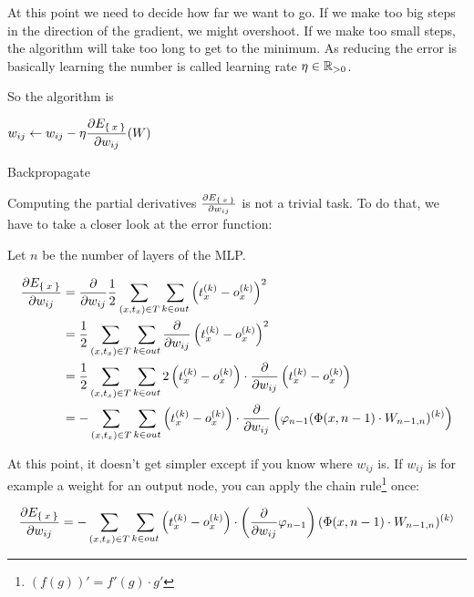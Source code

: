 At this point we need to decide how far we want to go. If we make too big steps
in the direction of the gradient, we might overshoot. If we make too small steps,
the algorithm will take too long to get to the minimum. As reducing the error
is basically learning the number is called learning rate $\eta \in \mathbb{R}_{> 0}$.

So the algorithm is

\begin{algorithm}[h]
    \begin{algorithmic}
                            \State $\displaystyle w_{ij} \gets w_{ij} - \eta \frac{\partial E_{\Set{x}}}{\partial w_{ij}} (W)$
                        \EndFor
                    \EndFor
                \EndFor
            \EndWhile
        \EndFunction
    \end{algorithmic}
\caption{Backpropagate}
\label{alg:backpropagate}
\end{algorithm}

Computing the partial derivatives $\frac{\partial E_{\Set{x}}}{\partial w_{ij}}$
is not a trivial task. To do that, we have to take a closer look at the
error function:

Let $n$ be the number of layers of the \gls{MLP}.

\begin{align}
    \frac{\partial E_{\Set{x}}}{\partial w_{ij}}
    &= \frac{\partial}{\partial w_{ij}} \frac{1}{2} \sum_{(x, t_x) \in T} \sum_{k \in out} \left (t_{x}^{(k)} - o_{x}^{(k)} \right )^2\\
    &= \frac{1}{2} \sum_{(x, t_x) \in T} \sum_{k \in out} \frac{\partial}{\partial w_{ij}} \left (t_{x}^{(k)} - o_{x}^{(k)} \right )^2\\
    &= \frac{1}{2} \sum_{(x, t_x) \in T} \sum_{k \in out} 2 \left (t_{x}^{(k)} - o_{x}^{(k)} \right ) \cdot \frac{\partial}{\partial w_{ij}} \left (t_{x}^{(k)} - o_{x}^{(k)} \right )\\
    &= - \sum_{(x, t_x) \in T} \sum_{k \in out} \left (t_{x}^{(k)} - o_{x}^{(k)} \right ) \cdot \frac{\partial}{\partial w_{ij}} \left (\varphi_{n-1}(\Phi(x, n-1) \cdot W_{n-1,n})^{(k)} \right)
\end{align}

At this point, it doesn't get simpler except if you know where $w_{ij}$ is.
If $w_{ij}$ is for example a weight for an output node, you can apply the chain
rule\footnote{$(f(g))' = f'(g) \cdot g'$} once:

\begin{align}
    \frac{\partial E_{\Set{x}}}{\partial w_{ij}} &= - \sum_{(x, t_x) \in T} \sum_{k \in out} \left (t_{x}^{(k)} - o_{x}^{(k)} \right ) \cdot \left ( \frac{\partial}{\partial w_{ij}} \varphi_{n-1} \right )(\Phi(x, n-1) \cdot W_{n-1,n})^{(k)}\\
\end{align}